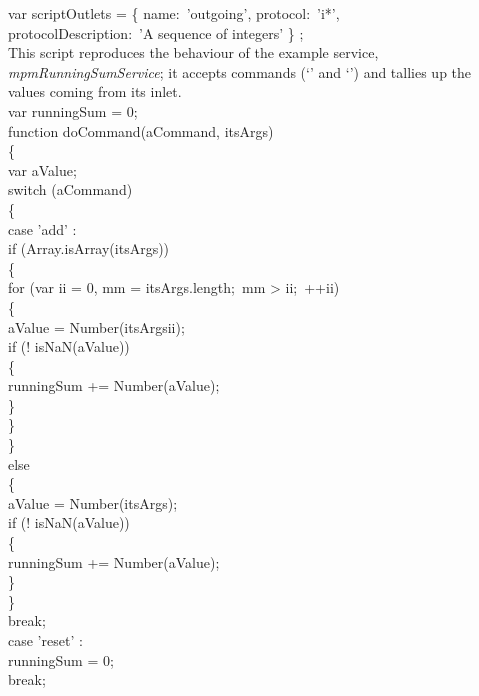 var scriptOutlets = \openSq{} \{ name:\ 'outgoing', protocol:\ 'i*',\\
\tS\tS\tS\tS\tS\tS\tS\tS\tS\tS{}protocolDescription:\ 'A sequence of integers' \}
\closeSq;\\
\codeEnd{}
\secondaryEnd{}
\newpage
{}
This script reproduces the behaviour of the example service,
\emph{mpmRunningSumService}; it accepts commands (`' and
`') and tallies up the values coming from its inlet.\\

\codeBegin{}
var runningSum = 0;\\

function doCommand(aCommand, itsArgs)\\
\{\\
\tS{}var aValue;\\
    
\tS{}switch (aCommand)\\
\tS\{\\
\tS\tS{}case 'add' :\\
\tS\tS\tS{}if (Array.isArray(itsArgs))\\
\tS\tS\tS\{\\
\tS\tS\tS\tS{}for (var ii = 0, mm = itsArgs.length;\ mm > ii;\ ++ii)\\
\tS\tS\tS\tS\{\\
\tS\tS\tS\tS\tS{}aValue = Number(itsArgs\openSq{}ii\closeSq);\\
\tS\tS\tS\tS\tS{}if (! isNaN(aValue))\\
\tS\tS\tS\tS\tS\{\\
\tS\tS\tS\tS\tS\tS{}runningSum += Number(aValue);\\
\tS\tS\tS\tS\tS\}\\
\tS\tS\tS\tS\}\\
\tS\tS\tS\}\\
\tS\tS\tS{}else\\
\tS\tS\tS\{\\
\tS\tS\tS\tS{}aValue = Number(itsArgs);\\
\tS\tS\tS\tS{}if (! isNaN(aValue))\\
\tS\tS\tS\tS\{\\
\tS\tS\tS\tS\tS{}runningSum += Number(aValue);\\
\tS\tS\tS\tS\}\\
\tS\tS\tS\}\\
\tS\tS\tS{}break;\\
            
\tS\tS{}case 'reset' :\\
\tS\tS\tS{}runningSum = 0;\\
\tS\tS\tS{}break;\\
            
